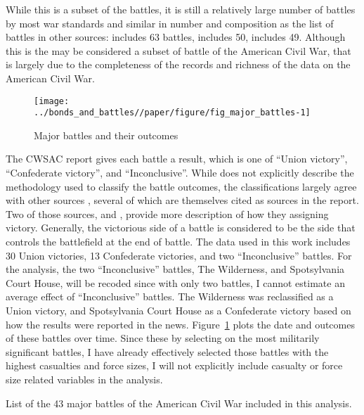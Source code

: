 While this is a subset of the battles, it is still a relatively large number of battles by most war standards and similar in number and composition as the list of battles in other sources: \textcite{Livermore1900} includes 63 battles, \textcite{Bodart1908} includes 50, \textcite{cdb90} includes 49.
Although this is the may be considered a subset of battle of the American Civil War, that is largely due to the completeness of the records and richness of the data on the American Civil War.

\begin{figure}[!htpb]
  \centering
  \texttt{[image: ../bonds\_and\_battles//paper/figure/fig\_major\_battles-1]}
  \caption{Major battles and their outcomes}
  \label{bonds:fig:major_battles}
\end{figure}

The CWSAC report \parencite{CWSAC1993b} gives each battle a result, which is one of ``Union victory'', ``Confederate victory'', and ``Inconclusive''.
While \textcite{CWSAC1993} does not explicitly describe the methodology used to classify the battle outcomes, the classifications largely agree with other sources \parencites{fox1898regimental}{Livermore1900}{Bodart1908}{cdb90}, several of which are themselves cited as sources in the report.
Two of those sources, \textcite{fox1898regimental} and \textcite{Livermore1900}, provide more description of how they assigning victory.
Generally, the victorious side of a battle is considered to be the side that controls the battlefield at the end of battle.
The data used in this work includes 30 Union victories, 13 Confederate victories, and two ``Inconclusive'' battles.
For the analysis, the two ``Inconclusive'' battles,  The Wilderness, and Spotsylvania Court House, will be recoded since with only two battles, I cannot estimate an average effect of ``Inconclusive'' battles.
The Wilderness was reclassified as a Union victory, and Spotsylvania Court House as a Confederate victory based on how the results were reported in the news.
Figure~\ref{bonds:fig:major_battles} plots the date and outcomes of these battles over time.%
Since these by selecting on the most militarily significant battles, I have already effectively selected those battles with the highest casualties and force sizes, I will not explicitly include casualty or force size related variables in the analysis.

\begin{table}
  \centering
  
  \caption{List of the 43 major battles of the American Civil War included in this analysis.}
  \label{bonds:tab:battles}
\end{table}

